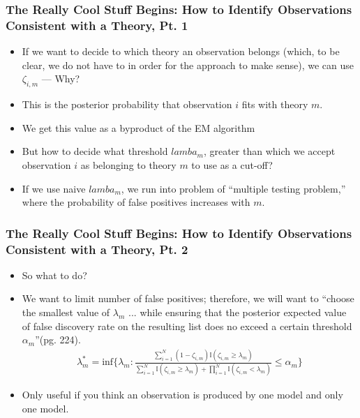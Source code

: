 \documentclass{beamer}
\begin{document}
\begin{frame}
\frametitle{The Really Cool Stuff Begins: How to Identify Observations Consistent with a Theory, Pt. 1}
\begin{itemize}
	\item If we want to decide to which theory an observation belongs (which, to be clear, we do not have to in order for the approach to make sense), we can use $\zeta_{i,m}$ --- Why?
	\pause
	\item This is the posterior probability that observation $i$ fits with theory $m$. 
	\item We get this value as a byproduct of the EM algorithm
	\item But how to decide what threshold $lamba_m$, greater than which we accept observation $i$ as belonging to theory $m$ to use as a cut-off?
	\item If we use naive $lamba_m$, we run into problem of ``multiple testing problem,'' where the probability of false positives increases with $m$. 
\end{itemize}
\end{frame}

\begin{frame}
\frametitle{The Really Cool Stuff Begins: How to Identify Observations Consistent with a Theory, Pt. 2}
\begin{itemize}
\item So what to do?
\pause
\item We want to limit number of false positives; therefore, we will want to ``choose the smallest value of $\lambda_m$ ... while ensuring that the posterior expected value of false discovery rate on the resulting list does no exceed a certain threshold $\alpha_m$''(pg. 224).
\begin{align}
\lambda_m^* = \text{inf}\bigg\{\lambda_m:\frac{\sum_{i=1}^{N}(1-\zeta_{i,m})\mathbb{I}(\zeta_{i,m}\ge \lambda_m)}{\sum_{i=1}^{N}\mathbb{I}(\zeta_{i,m}\ge \lambda_m) + \prod_{i=1}^{N}\mathbb{I}(\zeta_{i,m}< \lambda_m)} \le \alpha_m \bigg\}
\end{align}
\item Only useful if you think an observation is produced by one model and only one model.
\end{itemize}
\end{frame}
\end{document}
